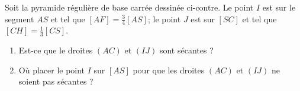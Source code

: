 
\begin{exercice}\label{exosmath-0081}

    \begin{multicols}{2}
        Soit la pyramide régulière de base carrée dessinée ci-contre. Le point \( I\) est sur le segment \( AS\) et tel que \( [AF]=\frac{ 3 }{ 4 }[AS]\); le point \( J\) est sur \( [SC]\) et tel que \( [CH]=\frac{1}{ 3 }[CS]\).

        \begin{enumerate}
            \item
        Est-ce que le droites \( (AC)\) et \( (IJ)\) sont sécantes ?
    \item
        Où placer le point \( I\) sur \( [AS]\) pour que les droites \( (AC)\) et \( (IJ)\) ne soient pas sécantes ?
        \end{enumerate}

        \columnbreak

        \begin{center}

        \end{center}

    \end{multicols}
    

\end{exercice}
